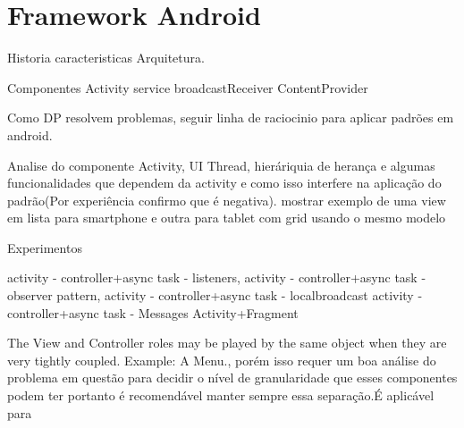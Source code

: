 \section{Framework Android}
 
Historia caracteristicas
Arquitetura.

Componentes
	Activity
	service
	broadcastReceiver
	ContentProvider



Como DP resolvem problemas, seguir linha de raciocinio para aplicar padrões em
android.


Analise do componente Activity, UI Thread, hieráriquia de herança e algumas
funcionalidades que dependem da activity e como isso interfere na aplicação do
padrão(Por experiência confirmo que é negativa). mostrar exemplo de uma view em
lista para smartphone e outra para tablet com grid usando o mesmo modelo

Experimentos

activity - controller+async task - listeners,
activity - controller+async task - observer pattern,
activity - controller+async task - localbroadcast
activity - controller+async task - Messages
Activity+Fragment


 The View and Controller roles may be played by the 
same object when they are very tightly coupled. Example: A Menu., porém isso
requer um boa análise do problema em questão para decidir o nível de
granularidade que esses componentes podem ter portanto é recomendável manter
sempre essa separação.É aplicável para 


